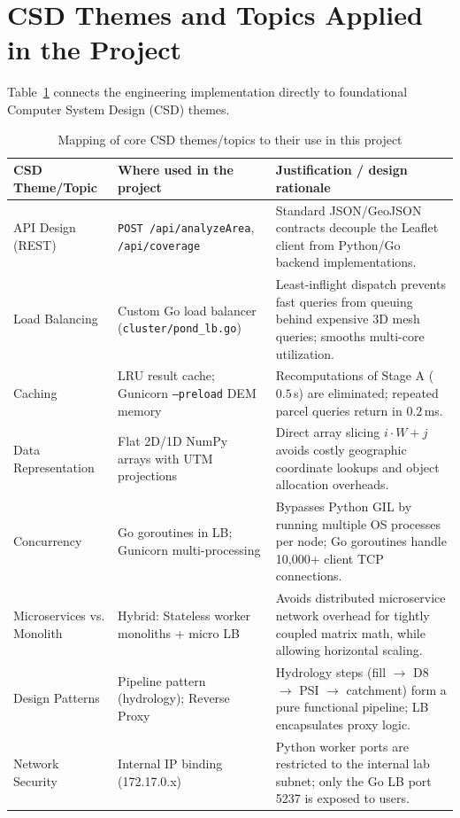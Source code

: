 \documentclass[manuscript,screen,review]{acmart}
\begin{document}
\section{CSD Themes and Topics Applied in the Project}
\label{sec:csd-themes}
Table~\ref{tab:csd-themes} connects the engineering implementation directly to foundational Computer System Design (CSD) themes.

\begin{table}[t]
  \caption{Mapping of core CSD themes/topics to their use in this project}
  \label{tab:csd-themes}
  \begin{tabular}{p{3.2cm}p{5.5cm}p{6.5cm}}
    \toprule
    CSD Theme/Topic & Where used in the project & Justification / design rationale \\
    \midrule
    API Design (REST) & \texttt{POST /api/analyzeArea}, \texttt{/api/coverage} & Standard JSON/GeoJSON contracts decouple the Leaflet client from Python/Go backend implementations. \\
    Load Balancing & Custom Go load balancer (\texttt{cluster/pond\_lb.go}) & Least-inflight dispatch prevents fast queries from queuing behind expensive 3D mesh queries; smooths multi-core utilization. \\
    Caching & LRU result cache; Gunicorn \texttt{--preload} DEM memory & Recomputations of Stage A ($0.5$\,s) are eliminated; repeated parcel queries return in $0.2$\,ms. \\
    Data Representation & Flat 2D/1D NumPy arrays with UTM projections & Direct array slicing $i \cdot W + j$ avoids costly geographic coordinate lookups and object allocation overheads. \\
    Concurrency & Go goroutines in LB; Gunicorn multi-processing & Bypasses Python GIL by running multiple OS processes per node; Go goroutines handle 10,000+ client TCP connections. \\
    Microservices vs. Monolith & Hybrid: Stateless worker monoliths + micro LB & Avoids distributed microservice network overhead for tightly coupled matrix math, while allowing horizontal scaling. \\
    Design Patterns & Pipeline pattern (hydrology); Reverse Proxy & Hydrology steps (fill $\to$ D8 $\to$ PSI $\to$ catchment) form a pure functional pipeline; LB encapsulates proxy logic. \\
    Network Security & Internal IP binding (172.17.0.x) & Python worker ports are restricted to the internal lab subnet; only the Go LB port 5237 is exposed to users. \\

\end{tabular}
\end{table}
\end{document}
